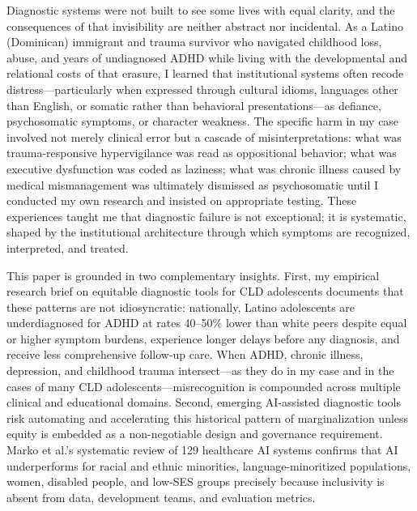 \documentclass[12pt,letterpaper]{article}
\begin{document}
Diagnostic systems were not built to see some lives with equal clarity, and the consequences of that invisibility are neither abstract nor incidental. As a Latino (Dominican) immigrant and trauma survivor who navigated childhood loss, abuse, and years of undiagnosed ADHD while living with the developmental and relational costs of that erasure, I learned that institutional systems often recode distress---particularly when expressed through cultural idioms, languages other than English, or somatic rather than behavioral presentations---as defiance, psychosomatic symptoms, or character weakness. \cite{garcia_ed415} The specific harm in my case involved not merely clinical error but a cascade of misinterpretations: what was trauma-responsive hypervigilance was read as oppositional behavior; what was executive dysfunction was coded as laziness; what was chronic illness caused by medical mismanagement was ultimately dismissed as psychosomatic until I conducted my own research and insisted on appropriate testing.\cite{garcia_ed415} These experiences taught me that diagnostic failure is not exceptional; it is systematic, shaped by the institutional architecture through which symptoms are recognized, interpreted, and treated.

This paper is grounded in two complementary insights. First, my empirical research brief on equitable diagnostic tools for CLD adolescents \cite{garcia_ed415} documents that these patterns are not idiosyncratic: nationally, Latino adolescents are underdiagnosed for ADHD at rates 40--50\% lower than white peers despite equal or higher symptom burdens, experience longer delays before any diagnosis, and receive less comprehensive follow-up care.\cite{garcia_ed415} When ADHD, chronic illness, depression, and childhood trauma intersect---as they do in my case and in the cases of many CLD adolescents---misrecognition is compounded across multiple clinical and educational domains. Second, emerging AI-assisted diagnostic tools risk automating and accelerating this historical pattern of marginalization unless equity is embedded as a non-negotiable design and governance requirement.\cite{marko2025} Marko et al.'s systematic review of 129 healthcare AI systems confirms that AI underperforms for racial and ethnic minorities, language-minoritized populations, women, disabled people, and low-SES groups precisely because inclusivity is absent from data, development teams, and evaluation metrics.\cite{marko2025}
\end{document}
